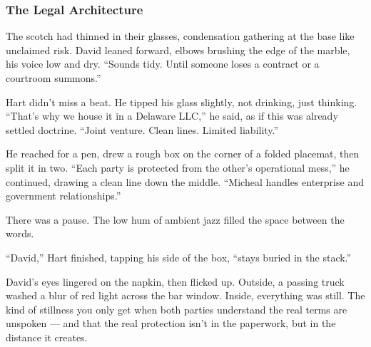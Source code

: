 \medskip

\subsubsection{The Legal Architecture}

The scotch had thinned in their glasses, condensation gathering at the base like unclaimed risk. David leaned forward, 
elbows brushing the edge of the marble, his voice low and dry. “Sounds tidy. Until someone loses a contract or a 
courtroom summons.”

Hart didn’t miss a beat. He tipped his glass slightly, not drinking, just thinking. “That’s why we house it in a 
Delaware LLC,” he said, as if this was already settled doctrine. “Joint venture. Clean lines. Limited liability.”

He reached for a pen, drew a rough box on the corner of a folded placemat, then split it in two. “Each party is 
protected from the other’s operational mess,” he continued, drawing a clean line down the middle. “Micheal 
handles enterprise and government relationships.”

There was a pause. The low hum of ambient jazz filled the space between the words.

“David,” Hart finished, tapping his side of the box, “stays buried in the stack.”

David’s eyes lingered on the napkin, then flicked up. Outside, a passing truck washed a blur of red light across 
the bar window. Inside, everything was still. The kind of stillness you only get when both parties understand 
the real terms are unspoken — and that the real protection isn’t in the paperwork, but in the distance it creates.

\medskip

